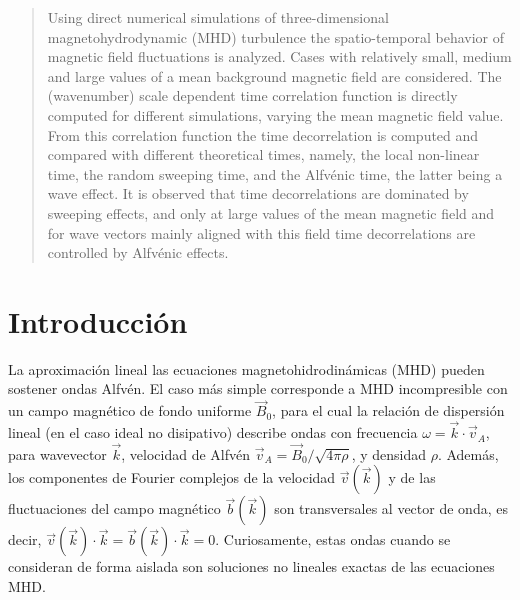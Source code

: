 \begin{abstract}
  Using direct numerical simulations of three-dimensional magnetohydrodynamic (MHD)
  turbulence the spatio-temporal behavior of magnetic field
  fluctuations is analyzed.  Cases with relatively small, medium and
  large values of a mean background magnetic field are considered. The
  (wavenumber) scale dependent time correlation function is directly
  computed for different simulations, varying the mean magnetic field
  value. From this correlation function the time decorrelation is
  computed and compared with different theoretical times, namely,
  the local non-linear time, the random sweeping time, and the
  Alfv\'enic time, the latter being a wave effect. It is observed that
  time decorrelations are dominated by sweeping effects, and only at
  large values of the mean magnetic field and for wave vectors mainly
  aligned with this field time decorrelations are controlled by
  Alfv\'enic effects.
\end{abstract}

\section{Introducción}\label{C4Sintro}

La aproximación lineal las ecuaciones magnetohidrodinámicas (MHD)
pueden sostener ondas Alfv\'en. El caso más simple corresponde a MHD
incompresible con un campo magnético de fondo uniforme $\vec{B}_0$,
para el cual la relación de dispersión lineal (en el caso ideal no
disipativo) describe ondas con frecuencia
$ \omega = \vec{k}\cdot\vec{v}_A$, para wavevector $\vec{k}$,
velocidad de Alfv\'en $\vec{v}_A = \vec{B}_0 / \sqrt{4\pi\rho}$, y
densidad $\rho$. Además, los componentes de Fourier complejos de la
velocidad $\vec{v}(\vec{k})$ y de las fluctuaciones del campo
magnético $\vec{b}(\vec{k})$ son transversales al vector de onda, es
decir,
$\vec{v}(\vec{k}) \cdot \vec{k} = \vec{b}(\vec{k}) \cdot \vec{k} =
0$. Curiosamente, estas ondas cuando se consideran de forma aislada
son soluciones no lineales exactas de las ecuaciones MHD.

